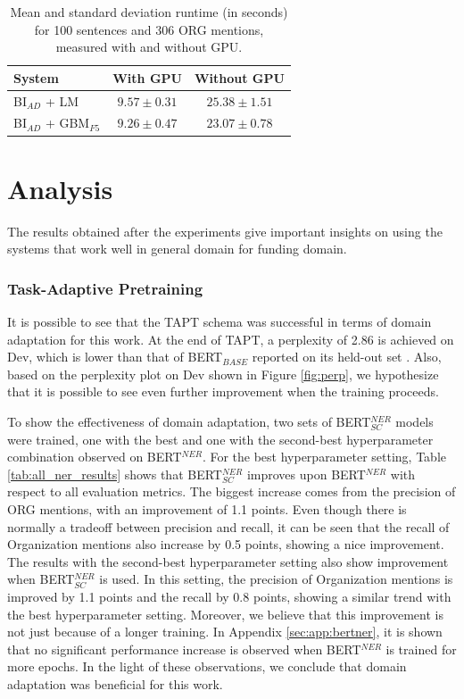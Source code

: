 \documentclass{report}
\theoremstyle{definition}
\theoremstyle{remark}
\begin{document}
\begin{table}[H]
    \centering
    \begin{tabular}{l|cc}
    System   & With GPU & Without GPU  \\
    \hline
    BI$_{AD}$ + LM & $9.57 \pm 0.31$ &$25.38 \pm 1.51$\\
    BI$_{AD}$ + GBM$_{F5}$ & $9.26 \pm 0.47$ &$23.07 \pm 0.78$\\
    \end{tabular}
    \caption{Mean and standard deviation runtime (in seconds) for 100 sentences and 306 ORG mentions, measured with and without GPU.}
    \label{tab:lmvsgbm2}
\end{table}


\section{Analysis}
\label{sec:EvalAnalysis}

The results obtained after the experiments give important insights on using the systems that work well in general domain for funding domain. 

\subsubsection{Task-Adaptive Pretraining}

It is possible to see that the TAPT schema was successful in terms of domain adaptation for this work. At the end of TAPT, a perplexity of 2.86 is achieved on Dev, which is lower than that of BERT$_{BASE}$ reported on its held-out set \cite{BERT}. Also, based on the perplexity plot on Dev shown in Figure \ref{fig:perp}, we hypothesize that it is possible to see even further improvement when the training proceeds.

To show the effectiveness of domain adaptation, two sets of BERT$^{NER}_{SC}$ models were trained, one with the best and one with the second-best hyperparameter combination observed on BERT$^{NER}$. For the best hyperparameter setting, Table \ref{tab:all_ner_results} shows that BERT$^{NER}_{SC}$ improves upon BERT$^{NER}$ with respect to all evaluation metrics. The biggest increase comes from the precision of ORG mentions, with an improvement of 1.1 points. Even though there is normally a tradeoff between precision and recall, it can be seen that the recall of Organization mentions also increase by 0.5 points, showing a nice improvement. The results with the second-best hyperparameter setting also show improvement when BERT$^{NER}_{SC}$ is used. In this setting, the precision of Organization mentions is improved by 1.1 points and the recall by 0.8 points, showing a similar trend with the best hyperparameter setting. Moreover, we believe that this improvement is not just because of a longer training. In Appendix \ref{sec:app:bertner}, it is shown that no significant performance increase is observed when BERT$^{NER}$ is trained for more epochs. In the light of these observations, we conclude that domain adaptation was beneficial for this work. 
\end{document}
